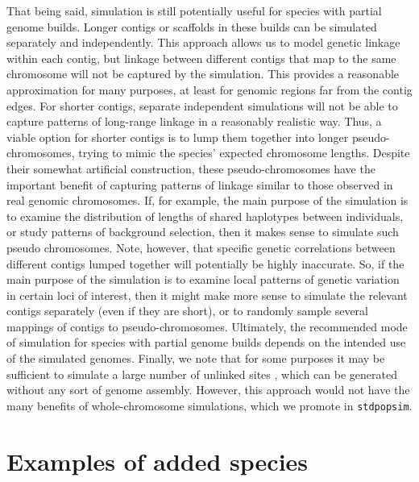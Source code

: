 \documentclass[hidelinks]{article}
\makeatletter
\newcommand{\stdpopsim}{\texttt{stdpopsim}\xspace}
\newcommand{\labelname}[1]{\def\@currentlabelname{#1}}
\makeatother
\begin{document}
That being said, simulation is still potentially useful for species with partial genome builds.
Longer contigs or scaffolds in these builds can be simulated separately and independently.
%
This approach allows us to model genetic linkage within each contig,
but linkage between different contigs that map to the same chromosome will not be captured by the simulation.
This provides a reasonable approximation for many purposes, at least for genomic regions far from the contig edges.
%
For shorter contigs, separate independent simulations will not be able to capture patterns of long-range linkage in a reasonably realistic way.
%
Thus, a viable option for shorter contigs is to lump them together into longer pseudo-chromosomes, trying to mimic the species' expected chromosome lengths.
%
Despite their somewhat artificial construction,
these pseudo-chromosomes have the important benefit of
capturing patterns of linkage similar to those observed in real genomic chromosomes.
If, for example, the main purpose of the simulation is to examine the distribution of lengths of shared haplotypes between individuals,
or study patterns of background selection,
then it makes sense to simulate such pseudo chromosomes.
Note, however, that specific genetic correlations between different contigs lumped together will potentially be highly inaccurate.
So, if the main purpose of the simulation is to examine local patterns of genetic variation in certain loci of interest, then it might make more sense to simulate the relevant contigs separately (even if they are short), or to randomly sample several mappings of contigs to pseudo-chromosomes.
%
Ultimately, the recommended mode of simulation for species with partial genome builds depends on the intended use of the simulated genomes.
Finally, we note that for some purposes it may be sufficient to simulate a large number of unlinked sites \citep{Gutenkunst2009,Excoffier2013},
which can be generated without any sort of genome assembly.
However, this approach would not have the many benefits of whole-chromosome simulations,
which we promote in \stdpopsim.


\section*{Examples of added species}
    \labelname{Examples}
    \label{sec:examples}
\end{document}
